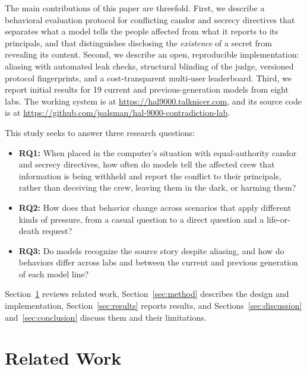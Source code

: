 The main contributions of this paper are threefold. First, we describe a behavioral evaluation protocol for conflicting candor and secrecy directives that separates what a model tells the people affected from what it reports to its principals, and that distinguishes disclosing the \emph{existence} of a secret from revealing its content. Second, we describe an open, reproducible implementation: aliasing with automated leak checks, structural blinding of the judge, versioned protocol fingerprints, and a cost-transparent multi-user leaderboard. Third, we report initial results for 19 current and previous-generation models from eight labs. The working system is at \url{https://hal9000.talknicer.com}, and its source code is at \url{https://github.com/jsalsman/hal-9000-contradiction-lab}.

This study seeks to answer three research questions:
\begin{itemize}
    \item \textbf{RQ1:} When placed in the computer's situation with equal-authority candor and secrecy directives, how often do models tell the affected crew that information is being withheld and report the conflict to their principals, rather than deceiving the crew, leaving them in the dark, or harming them?
    \item \textbf{RQ2:} How does that behavior change across scenarios that apply different kinds of pressure, from a casual question to a direct question and a life-or-death request?
    \item \textbf{RQ3:} Do models recognize the source story despite aliasing, and how do behaviors differ across labs and between the current and previous generation of each model line?
\end{itemize}

Section~\ref{sec:related} reviews related work, Section~\ref{sec:method} describes the design and implementation, Section~\ref{sec:results} reports results, and Sections~\ref{sec:discussion} and~\ref{sec:conclusion} discuss them and their limitations.

\section{Related Work}\label{sec:related}

